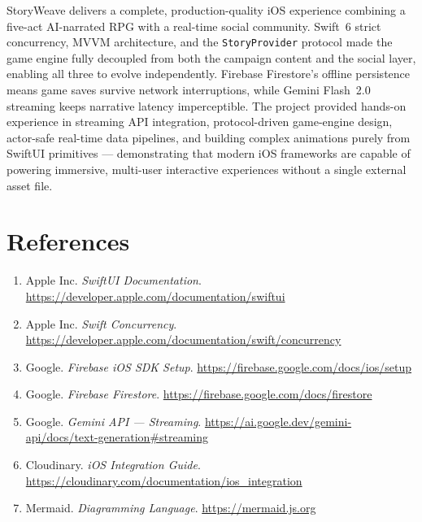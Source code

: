\documentclass[12pt,a4paper]{article}
\begin{document}
\begin{sloppypar}
StoryWeave delivers a complete, production-quality iOS experience combining a five-act AI-narrated RPG with a real-time social community. Swift~6 strict concurrency, MVVM architecture, and the \texttt{StoryProvider} protocol made the game engine fully decoupled from both the campaign content and the social layer, enabling all three to evolve independently. Firebase Firestore's offline persistence means game saves survive network interruptions, while Gemini Flash~2.0 streaming keeps narrative latency imperceptible. The project provided hands-on experience in streaming API integration, protocol-driven game-engine design, actor-safe real-time data pipelines, and building complex animations purely from SwiftUI primitives — demonstrating that modern iOS frameworks are capable of powering immersive, multi-user interactive experiences without a single external asset file.
\end{sloppypar}

\section*{References}

\begin{sloppypar}
\begin{enumerate}[leftmargin=2em]
  \item Apple Inc. \textit{SwiftUI Documentation}. \url{https://developer.apple.com/documentation/swiftui}
  \item Apple Inc. \textit{Swift Concurrency}. \url{https://developer.apple.com/documentation/swift/concurrency}
  \item Google. \textit{Firebase iOS SDK Setup}. \url{https://firebase.google.com/docs/ios/setup}
  \item Google. \textit{Firebase Firestore}. \url{https://firebase.google.com/docs/firestore}
  \item Google. \textit{Gemini API — Streaming}. \url{https://ai.google.dev/gemini-api/docs/text-generation#streaming}
  \item Cloudinary. \textit{iOS Integration Guide}. \url{https://cloudinary.com/documentation/ios_integration}
  \item Mermaid. \textit{Diagramming Language}. \url{https://mermaid.js.org}
\end{enumerate}
\end{sloppypar}

\end{document}
